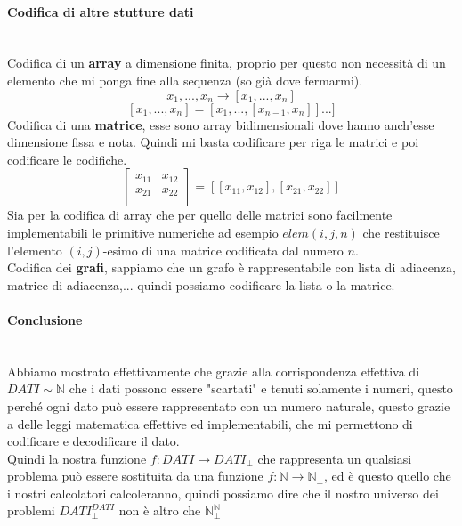 \documentclass{article}
\begin{document}
\paragraph{Codifica di altre stutture dati}\mbox{}\\
Codifica di un \textbf{array} a dimensione finita, proprio per questo non necessità di
un elemento che mi ponga fine alla sequenza (so già dove fermarmi).
$$x_1,...,x_n\rightarrow[x_1,...,x_n]$$
$$[x_1,...,x_n]=[x_1,...,[x_{n-1},x_n]]...]$$
Codifica di una \textbf{matrice}, esse sono array bidimensionali dove hanno anch'esse
dimensione fissa e nota. Quindi mi basta codificare per riga le matrici e poi codificare
le codifiche.
\[
    \begin{bmatrix}
        x_{11} & x_{12} \\
        x_{21} & x_{22} \\
    \end{bmatrix}
    =\left[[x_{11},x_{12}],[x_{21},x_{22}]\right]
\]
Sia per la codifica di array che per quello delle matrici sono facilmente implementabili
le primitive numeriche ad esempio $elem(i,j,n)$ che restituisce l'elemento $(i,j)$-esimo
di una matrice codificata dal numero $n$.\\Codifica dei \textbf{grafi}, sappiamo
che un grafo è rappresentabile con lista di adiacenza, matrice di adiacenza,...
quindi possiamo codificare la lista o la matrice.
\paragraph{Conclusione}\mbox{}\\
Abbiamo mostrato effettivamente che grazie alla
corrispondenza effettiva di $DATI\sim\mathbb{N}$ che i dati possono essere "scartati" e tenuti solamente i
numeri, questo perché ogni dato può essere rappresentato con un numero naturale, questo
grazie a delle leggi matematica effettive ed implementabili, che mi
permettono di codificare e decodificare il dato.\\Quindi la nostra funzione $f:DATI\rightarrow DATI_{\bot}$
che rappresenta un qualsiasi problema può essere sostituita da una funzione $f:\mathbb{N}\rightarrow\mathbb{N}_\bot$,
ed è questo quello che i nostri calcolatori calcoleranno, quindi possiamo dire che il nostro universo
dei problemi $DATI^{DATI}_\bot$ non è altro che $\mathbb{N}^{\mathbb{N}}_\bot$
\end{document}
